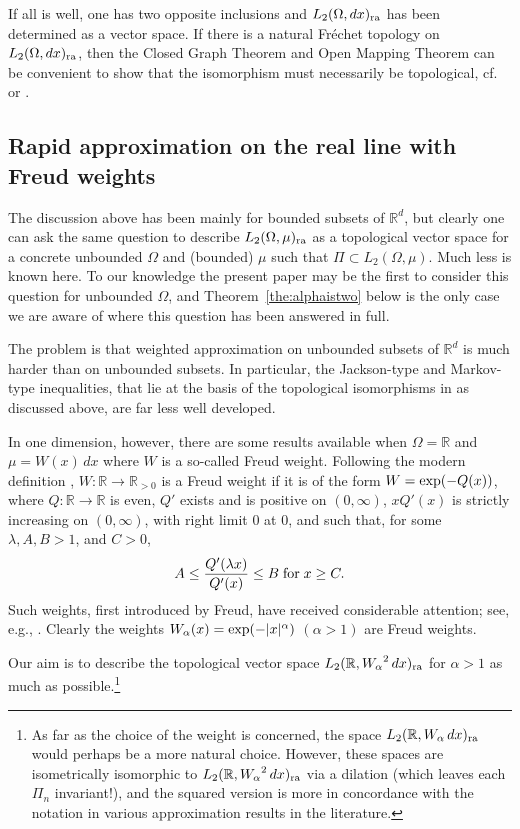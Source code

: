 \documentclass[12pt, reqno]{amsart}
\numberwithin{equation}{section}
\theoremstyle{plain}
\theoremstyle{definition}
\begin{document}
If all is well, one has two opposite inclusions and $L_2(\Omega,dx)_{\textup{ra}}$ has been determined as a vector space. If there is a natural Fr\'echet topology on  $L_2(\Omega,dx)_{\textup{ra}}$, then the Closed Graph Theorem and Open Mapping Theorem can be convenient to show that the isomorphism must necessarily be topological, cf.~\cite{Zerner} or \cite[p.~693]{Zeriahi}.

\subsection{Rapid approximation on the real line with Freud weights}
The discussion above has been mainly for bounded subsets of ${{\mathbb R}}^d$, but clearly one can ask the same question to describe $L_2(\Omega,\mu)_{\textup{ra}}$ as a topological vector space for a concrete unbounded $\Omega$ and (bounded) $\mu$ such that $\Pi\subset L_2(\Omega,\mu)$. Much less is known here. To our knowledge the present paper may be the first to consider this question for unbounded $\Omega$, and Theorem~\ref{the:alphaistwo} below is the only case we are aware of where this question has been answered in full.

The problem is that weighted approximation on unbounded subsets of ${{\mathbb R}}^d$ is much harder than on unbounded subsets. In particular, the Jackson-type and Markov-type inequalities, that lie at the basis of the topological isomorphisms in \cite{Zerner, Zeriahi} as discussed above, are far less well developed.

In one dimension, however, there are some results available when $\Omega={{\mathbb R}}$ and $\mu=W(x)\,dx$ where $W$ is a so-called Freud weight. Following the modern definition \cite[Definition~3.3]{Lu}, $W:{{\mathbb R}}\to{{\mathbb R}}_{>0}$ is a Freud weight if it is of the form $W=\textup{exp}(-Q(x))$, where $Q:{{\mathbb R}}\rightarrow {{\mathbb R}}$ is even, $Q'$ exists and is positive on $(0,\infty)$, $xQ'(x)$ is strictly increasing on $(0,\infty)$, with right limit $0$ at $0$, and such that, for some $\lambda,A,B>1$, and $C>0$,
\begin{equation*}
A\leq \frac{Q'(\lambda x)}{Q'(x)}\leq B\;\textup{for}\;x\geq C.
\end{equation*}
Such weights, first introduced by Freud, have received considerable attention; see, e.g., \cite{DitTot,Freud1, Freud2, Freud3, LeLu1, LeLu2,Mha}. Clearly the weights ${W_\alpha}(x)=\textup{exp}(-|x|^{\alpha})$ $(\alpha > 1)$ are Freud weights.

Our aim is to describe the topological vector space ${L_2({{\mathbb R}},{W_\alpha}^2\,dx)_{\textup{ra}}}$ for $\alpha>1$ as much as possible.\footnote{As far as the choice of the weight is concerned, the space $L_2({{\mathbb R}},W_\alpha\,dx)_{\textup{ra}}$ would perhaps be a more natural choice. However, these spaces are isometrically isomorphic to ${L_2({{\mathbb R}},{W_\alpha}^2\,dx)_{\textup{ra}}}$ via a dilation (which leaves each $\Pi_n$ invariant!), and the squared version is more in concordance with the notation in various approximation results in the literature.}
\end{document}

